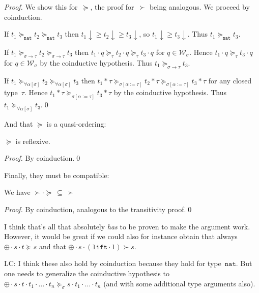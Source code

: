 \documentclass[runningheads,a4paper]{llncs}
\newcommand{\World}{\mathcal{W}}
\newcommand{\app}[2]{#1 \cdot #2}
\newcommand{\tapp}[2]{#1 * #2}
\newcommand{\subst}[2]{#1:=#2}
\newcommand{\nat}{\mathtt{nat}}
\newcommand{\lift}{\mathtt{lift}}
\newcommand{\da}{\downarrow}
\begin{document}
\begin{proof}
  We show this for~$\succeq$, the proof for~$\succ$ being
  analogous. We proceed by coinduction.

  If $t_1 \succeq_\nat t_2 \succeq_\nat t_3$ then
  $t_1\da \ge t_2\da \ge t_3\da$, so $t_1\da \ge t_3\da$. Thus
  $t_1 \succeq_\nat t_3$.

  If $t_1 \succeq_{\sigma\to\tau}t_2\succeq_{\sigma\to\tau}t_3$ then
  $\app{t_1}{q}\succeq_{\tau}\app{t_2}{q}\succeq_\tau\app{t_3}{q}$ for
  $q \in \World_\sigma$. Hence $\app{t_1}{q}\succeq_\tau\app{t_3}{q}$
  for $q \in \World_\sigma$ by the coinductive hypothesis. Thus
  $t_1\succeq_{\sigma\to\tau} t_3$.

  If $t_1 \succeq_{\forall\alpha[\sigma]}t_2\succeq_{\forall\alpha[\sigma]}t_3$ then
  $\tapp{t_1}{\tau}\succeq_{\sigma[\subst{\alpha}{\tau}]}\tapp{t_2}{\tau}\succeq_{\sigma[\subst{\alpha}{\tau}]}\tapp{t_3}{\tau}$ for
  any closed type~$\tau$. Hence
  $\tapp{t_1}{\tau}\succeq_{\sigma[\subst{\alpha}{\tau}]}\tapp{t_3}{\tau}$
  by the coinductive hypothesis. Thus $t_1\succeq_{\forall\alpha[\sigma]} t_3$.\qed
\end{proof}

And that $\succeq$ is a quasi-ordering:

\begin{lemma}
$\succeq$ is reflexive.
\end{lemma}

\begin{proof}
  By coinduction.\qed
\end{proof}

Finally, they must be compatible:

\begin{lemma}
We have $\succ \cdot \succeq\ \subseteq\ \succ$
\end{lemma}

\begin{proof}
By coinduction, analogous to the transitivity proof.\qed
\end{proof}

I think that's all that absolutely \emph{has} to be proven to make the
argument work.  However, it would be great if we could also for
instance obtain that always $\app{\app{\oplus}{s}}{t} \succeq s$ and
that $\app{\app{\oplus}{s}}{(\app{\lift}{1})} \succ s$.

LC: I think these also hold by coinduction because they hold for
type~$\nat$. But one needs to generalize the coinductive hypothesis to
$\app{\app{\oplus}{s}}{t} \cdot t_1 \cdot \ldots \cdot t_n
\succeq_\sigma s \cdot t_1 \cdot \ldots \cdot t_n$ (and with some
additional type arguments also).
\end{document}
